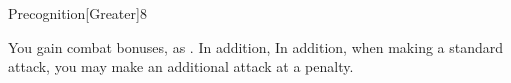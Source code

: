 \begin{spellsection}{Precognition}[Greater]{8}
\begin{spellheader}
\end{spellheader}
\begin{spellcontent}
    \begin{spelltargetinginfo}
    \end{spelltargetinginfo}
    \begin{spelleffects}
        \spelleffect You gain combat bonuses, as . In addition, In addition, when making a standard attack, you may make an additional attack at a  penalty.
        \spelldur \durshort \dismissable
    \end{spelleffects}
\end{spellcontent}
\begin{spellfooter}
\end{spellfooter}
\end{spellsection}

